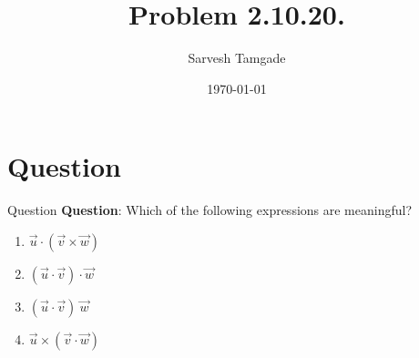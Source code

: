 \documentclass{beamer}
\title{Problem 2.10.20.}
\author{Sarvesh Tamgade}
\date{\today}
\numberwithin{equation}{section}
\begin{document}
\begin{frame}
\titlepage
\end{frame}
\section{Question}
\begin{frame}{Question}
\textbf{Question}:
 Which of the following expressions are meaningful?
\begin{multicols}{2}
\begin{enumerate}[label=(\alph*)]
     
\item $\vec{u} \cdot (\vec{v} \times \vec{w})$
\item $(\vec{u} \cdot \vec{v}) \cdot \vec{w}$
\item $(\vec{u} \cdot \vec{v})\ \vec{w}$
\item $\vec{u} \times (\vec{v} \cdot \vec{w})$

\end{enumerate}
\end{multicols}
\end{frame}
\end{document}
